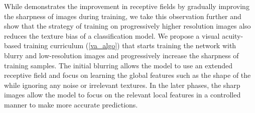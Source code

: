 %
While \cite{vogelsang2018VisualAcuity} demonstrates the improvement in receptive fields by gradually improving the sharpness of images during training, we take this observation further and show that the strategy of training on progressively higher resolution images also reduces the texture bias of a classification model. We propose a visual acuity-based training curriculum (\cref{va_algo}) that starts training the network with blurry and low-resolution \usg images and progressively increase the sharpness of training samples. The initial blurring allows the model to use an extended receptive field and focus on learning the global features such as the shape of the \gb while ignoring any noise or irrelevant textures. In the later phases, the sharp images allow the model to focus on the relevant local features in a controlled manner to make more accurate predictions. 

